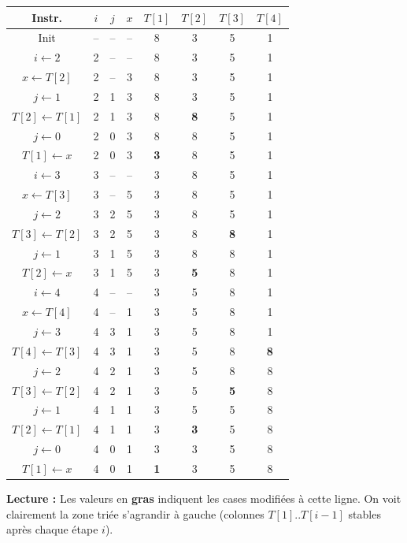 \documentclass[11pt]{article}
\begin{document}
\begin{exemplebox}[{Table d'exécution complète pour $T = [8, 3, 5, 1]$ ($N=4$)}]
\begin{center}
\begin{tabular}{|c|c|c|c|c|c|c|c|}
\hline
\rowcolor{popblueL} \textbf{Instr.} & \textbf{$i$} & \textbf{$j$} & \textbf{$x$} & \textbf{$T[1]$} & \textbf{$T[2]$} & \textbf{$T[3]$} & \textbf{$T[4]$} \\
\hline
Init & -- & -- & -- & 8 & 3 & 5 & 1 \\
\hline
$i \leftarrow 2$ & 2 & -- & -- & 8 & 3 & 5 & 1 \\
$x \leftarrow T[2]$ & 2 & -- & 3 & 8 & 3 & 5 & 1 \\
$j \leftarrow 1$ & 2 & 1 & 3 & 8 & 3 & 5 & 1 \\
$T[2] \leftarrow T[1]$ & 2 & 1 & 3 & 8 & \textbf{8} & 5 & 1 \\
$j \leftarrow 0$ & 2 & 0 & 3 & 8 & 8 & 5 & 1 \\
$T[1] \leftarrow x$ & 2 & 0 & 3 & \textbf{3} & 8 & 5 & 1 \\
\hline
$i \leftarrow 3$ & 3 & -- & -- & 3 & 8 & 5 & 1 \\
$x \leftarrow T[3]$ & 3 & -- & 5 & 3 & 8 & 5 & 1 \\
$j \leftarrow 2$ & 3 & 2 & 5 & 3 & 8 & 5 & 1 \\
$T[3] \leftarrow T[2]$ & 3 & 2 & 5 & 3 & 8 & \textbf{8} & 1 \\
$j \leftarrow 1$ & 3 & 1 & 5 & 3 & 8 & 8 & 1 \\
$T[2] \leftarrow x$ & 3 & 1 & 5 & 3 & \textbf{5} & 8 & 1 \\
\hline
$i \leftarrow 4$ & 4 & -- & -- & 3 & 5 & 8 & 1 \\
$x \leftarrow T[4]$ & 4 & -- & 1 & 3 & 5 & 8 & 1 \\
$j \leftarrow 3$ & 4 & 3 & 1 & 3 & 5 & 8 & 1 \\
$T[4] \leftarrow T[3]$ & 4 & 3 & 1 & 3 & 5 & 8 & \textbf{8} \\
$j \leftarrow 2$ & 4 & 2 & 1 & 3 & 5 & 8 & 8 \\
$T[3] \leftarrow T[2]$ & 4 & 2 & 1 & 3 & 5 & \textbf{5} & 8 \\
$j \leftarrow 1$ & 4 & 1 & 1 & 3 & 5 & 5 & 8 \\
$T[2] \leftarrow T[1]$ & 4 & 1 & 1 & 3 & \textbf{3} & 5 & 8 \\
$j \leftarrow 0$ & 4 & 0 & 1 & 3 & 3 & 5 & 8 \\
$T[1] \leftarrow x$ & 4 & 0 & 1 & \textbf{1} & 3 & 5 & 8 \\
\hline
\end{tabular}
\end{center}
\textbf{Lecture :} Les valeurs en \textbf{gras} indiquent les cases modifiées à cette ligne. On voit clairement la zone triée s'agrandir à gauche (colonnes $T[1]..T[i-1]$ stables après chaque étape $i$).
\end{exemplebox}
\end{document}
